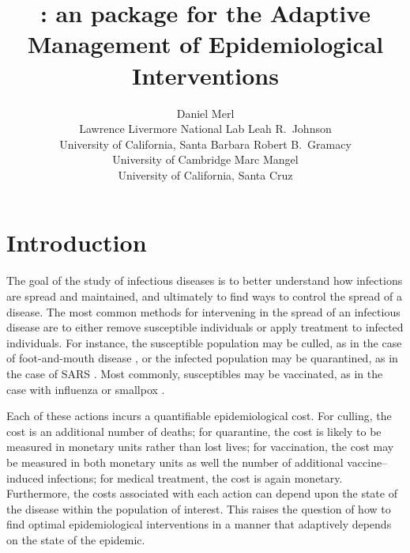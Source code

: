 \documentclass[shortnames,nojss]{jss}
\title{\pkg{amei}: an \proglang{R} package for the Adaptive\\ 
  Management of Epidemiological Interventions}
\author{Daniel Merl\\
  Lawrence Livermore National Lab
 \And Leah R.~Johnson\\
 University of California, Santa Barbara
  \AND Robert B.~Gramacy\\
  University of Cambridge
  \And Marc Mangel\\
 University of California, Santa Cruz}
\begin{document}




\section{Introduction}
\label{sec:motivate}


The goal of the study of infectious diseases is to better understand
how infections are spread and maintained, and ultimately to find ways
to control the spread of a disease. The most common methods for
intervening in the spread of an infectious disease are to either remove
susceptible individuals or apply treatment to infected
individuals. For instance, the susceptible population may be culled,
as in the case of foot-and-mouth disease
\citep{tildesley06,enserink01}, or the infected population may be
quarantined, as in the case of SARS \citep{lloyd-smith03}. Most
commonly, susceptibles may be vaccinated, as in the case with
influenza or smallpox \citep{ferguson03,halloran02}.

Each of these actions incurs a quantifiable epidemiological cost.  For
culling, the cost is an additional number of deaths; for quarantine,
the cost is likely to be measured in monetary units rather than lost
lives; for vaccination, the cost may be measured in both monetary
units as well the number of additional vaccine--induced infections;
for medical treatment, the cost is again monetary. Furthermore, the
costs associated with each action can depend upon the state of the
disease within the population of interest. This raises the question of
how to find optimal epidemiological interventions in a manner that
adaptively depends on the state of the epidemic.
\end{document}
